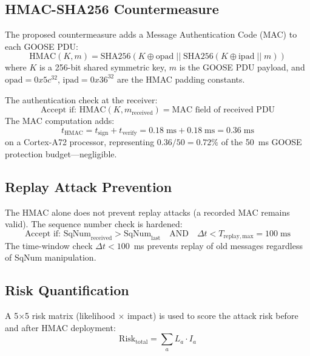 \subsection{HMAC-SHA256 Countermeasure}

The proposed countermeasure adds a Message Authentication Code (MAC)
to each GOOSE PDU:
\begin{equation}
  \mathrm{HMAC}(K, m) = \mathrm{SHA256}\!\left(K \oplus \mathrm{opad}\;||\;
    \mathrm{SHA256}(K \oplus \mathrm{ipad}\;||\; m)\right)
  \label{eq:ch9_hmac}
\end{equation}
where $K$ is a 256-bit shared symmetric key, $m$ is the GOOSE PDU payload,
and $\mathrm{opad} = 0x5c^{32}$, $\mathrm{ipad} = 0x36^{32}$ are the
HMAC padding constants.

The authentication check at the receiver:
\begin{equation}
  \text{Accept if: } \mathrm{HMAC}(K, m_\mathrm{received}) =
    \text{MAC field of received PDU}
  \label{eq:ch9_hmac_check}
\end{equation}
The MAC computation adds:
\begin{equation}
  t_\mathrm{HMAC} = t_\mathrm{sign} + t_\mathrm{verify}
  = 0.18\;\mathrm{ms} + 0.18\;\mathrm{ms} = 0.36\;\mathrm{ms}
  \label{eq:ch9_hmac_latency}
\end{equation}
on a Cortex-A72 processor, representing $0.36/50 = 0.72\%$ of the
50~ms GOOSE protection budget—negligible.

\subsection{Replay Attack Prevention}

The HMAC alone does not prevent replay attacks (a recorded MAC remains
valid). The sequence number check is hardened:
\begin{equation}
  \text{Accept if: } \mathrm{SqNum}_\mathrm{received} >
    \mathrm{SqNum}_\mathrm{last}
  \quad\text{AND}\quad
  \Delta t < T_\mathrm{replay,max} = 100\;\mathrm{ms}
  \label{eq:ch9_replay}
\end{equation}
The time-window check $\Delta t < 100$~ms prevents replay of old
messages regardless of SqNum manipulation.

\subsection{Risk Quantification}

A 5$\times$5 risk matrix (likelihood $\times$ impact) is used to
score the attack risk before and after HMAC deployment:
\begin{equation}
  \mathrm{Risk}_\mathrm{total} = \sum_a L_a \cdot I_a
  \label{eq:ch9_risk}
\end{equation}

